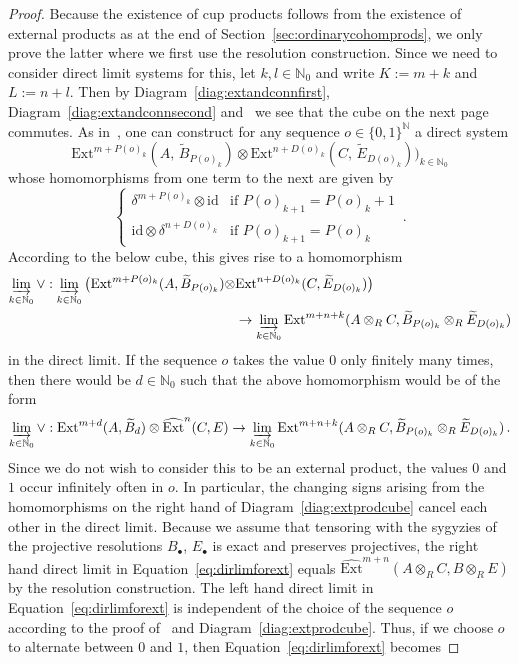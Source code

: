 \documentclass[12pt, a4paper]{article}
\numberwithin{equation}{section}
\theoremstyle{empty}
\theoremstyle{nonumberplain}
\newtheorem{proof}{Proof}
\begin{document}
\begin{proof}
Because the existence of cup products follows from the existence of external products as at the end of Section~\ref{sec:ordinarycohomprods}, we only prove the latter where we first use the resolution construction. Since we need to consider direct limit systems for this, let $k, l \in \mathbb{N}_0$ and write $K := m+k$ and $L := n+l$. Then by Diagram~\ref{diag:extandconnfirst}, Diagram~\ref{diag:extandconnsecond} and~\cite[Proposition~III.4.1]{car56} we see that the cube on the next page commutes. As in~\cite[Definition~4.7]{ghe24}, one can construct for any sequence $o \in \lbrace 0, 1 \rbrace^{\mathbb{N}}$ a direct system
\[ \mathrm{Ext}^{m+P(o)_k}(A{,} \, \widetilde{B}_{P(o)_k}) \otimes \mathrm{Ext}^{n+D(o)_k}(C{,} \, \widetilde{E}_{D(o)_k}))_{k \in \mathbb{N}_0} \]
whose homomorphisms from one term to the next are given by
\[ \begin{cases} \delta^{m+{P(o)_k}} \otimes \mathrm{id} &\text{if } P(o)_{k+1} = P(o)_k+1 \\ \mathrm{id} \otimes \delta^{n+D(o)_k} &\text{if } P(o)_{k+1} = P(o)_k \end{cases} \, . \]
According to the below cube, this gives rise to a homomorphism
\begin{align}
\varinjlim_{k \in \mathbb{N}_0} \vee: \varinjlim_{k \in \mathbb{N}_0} \big(\mathrm{Ext}^{m+P(o)_k}(A, \widetilde{B}_{P(o)_k}) \otimes &\mathrm{Ext}^{n+D(o)_k}(C, \widetilde{E}_{D(o)_k})\big) \label{eq:dirlimforext} \\
&\rightarrow \varinjlim_{k \in \mathbb{N}_0} \mathrm{Ext}^{m+n+k}(A \otimes_R C, \widetilde{B}_{P(o)_k} \otimes_R \widetilde{E}_{D(o)_k}) \nonumber
\end{align}
in the direct limit. If the sequence $o$ takes the value $0$ only finitely many times, then there would be $d \in \mathbb{N}_0$ such that the above homomorphism would be of the form
\[ \varinjlim_{k \in \mathbb{N}_0} \vee: \mathrm{Ext}^{m+d}(A, \widetilde{B}_d) \otimes \widehat{\mathrm{Ext}}^n(C, E) \rightarrow \varinjlim_{k \in \mathbb{N}_0} \mathrm{Ext}^{m+n+k}(A \otimes_R C, \widetilde{B}_{P(o)_k} \otimes_R \widetilde{E}_{D(o)_k}) \, . \]
Since we do not wish to consider this to be an external product, the values $0$ and $1$ occur infinitely often in $o$. In particular, the changing signs arising from the homomorphisms on the right hand of Diagram~\ref{diag:extprodcube} cancel each other in the direct limit. Because we assume that tensoring with the sygyzies of the projective resolutions $B_{\bullet}$, $E_{\bullet}$ is exact and preserves projectives, the right hand direct limit in Equation~\ref{eq:dirlimforext} equals $\widehat{\mathrm{Ext}}^{m+n}(A \otimes_R C, B \otimes_R E)$ by the resolution construction. The left hand direct limit in Equation~\ref{eq:dirlimforext} is independent of the choice of the sequence $o$ according to the proof of~\cite[Theorem~4.15]{ghe24} and Diagram~\ref{diag:extprodcube}. Thus, if we choose $o$ to alternate between $0$ and $1$, then Equation~\ref{eq:dirlimforext} becomes

\end{proof}
\end{document}
